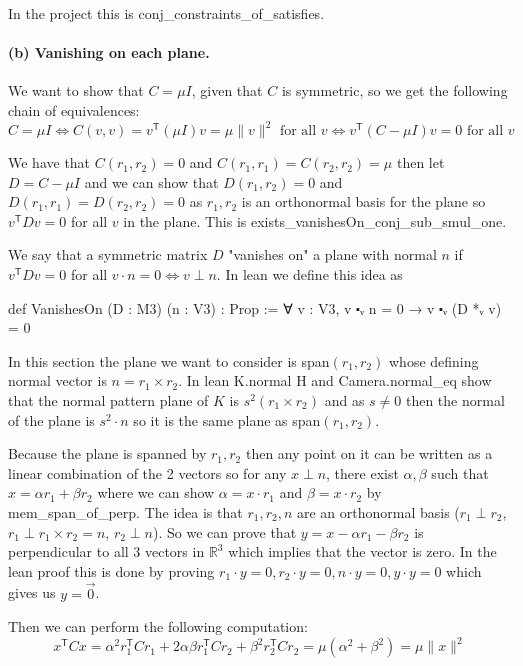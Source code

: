 \documentclass[10pt]{article}
\theoremstyle{plain}
\theoremstyle{definition}
\theoremstyle{remark}
\newcommand{\T}{^{\mathsf{T}}}
\newcommand{\lean}[1]{{\ttfamily\let\us\_\def\_{\us\allowbreak}#1}}
\begin{document}
In the project this is \lean{conj\_constraints\_of\_satisfies}.

\paragraph{(b) Vanishing on each plane.}

We want to show that $C=\mu I$, given that $C$ is symmetric, so we get the following chain of equivalences:
$$C =\mu I \iff C(v,v) =  v\T (\mu I)v = \mu \|v\|^2 \text{ for all $v$} \iff v\T (C - \mu I)v =0 \text{ for all $v$}$$

We have that $C(r_1, r_2)=0$ and $C(r_1, r_1) = C(r_2, r_2) = \mu$ then let $D=C- \mu I$ and we can show that $D(r_1,r_2)=0$ and $D(r_1, r_1) = D(r_2, r_2)=0$ as $r_1,r_2$ is an orthonormal basis for the plane so $v\T Dv=0$ for all $v$ in the plane. This is \lean{exists\_vanishesOn\_conj\_sub\_smul\_one}.

We say that a symmetric matrix $D$ "vanishes on" a plane with normal $n$ if $v\T Dv=0$ for all $v \cdot n=0 \iff v \perp n$. In lean we define this idea as
\begin{leancode}
def VanishesOn (D : M3) (n : V3) : Prop :=
    ∀ v : V3, v ⬝ᵥ n = 0 → v ⬝ᵥ (D *ᵥ v) = 0
\end{leancode}

In this section the plane we want to consider is span$(r_1, r_2)$ whose defining normal vector is $n=r_1 \times r_2$. In lean \lean{K.normal H} and \lean{Camera.normal\_eq} show that the normal pattern plane of $K$ is $s^2(r_1 \times r_2)$ and as $s \neq 0$ then the normal of the plane is $s^2 \cdot n$ so it is the same plane as span$(r_1, r_2)$.

Because the plane is spanned by $r_1,r_2$ then any point on it can be written as a linear combination of the 2 vectors so for any $x \perp n$, there exist $\alpha, \beta$ such that $x = \alpha r_1 + \beta r_2$ where we can show $\alpha =x \cdot r_1$ and $\beta=x \cdot r_2$ by \lean{mem\_span\_of\_perp}. The idea is that $r_1,r_2,n$ are an orthonormal basis ($r_1 \perp r_2$, $r_1 \perp r_1 \times r_2=n$, $r_2 \perp n$). So we can prove that $y=x-\alpha r_1 - \beta r_2$ is perpendicular to all 3 vectors in $\mathbb{R}^3$ which implies that the vector is zero. In the lean proof this is done by proving $r_1 \cdot y=0, r_2 \cdot y=0, n \cdot y=0, y \cdot y=0$ which gives us $y=\vec{0}$.

Then we can perform the following computation:
$$x\T Cx=\alpha^2 r_1\T Cr_1+2 \alpha \beta r_1\T Cr_2+\beta^2 r_2\T Cr_2=\mu (\alpha^2+\beta^2)=\mu \|x\|^2$$
\end{document}
